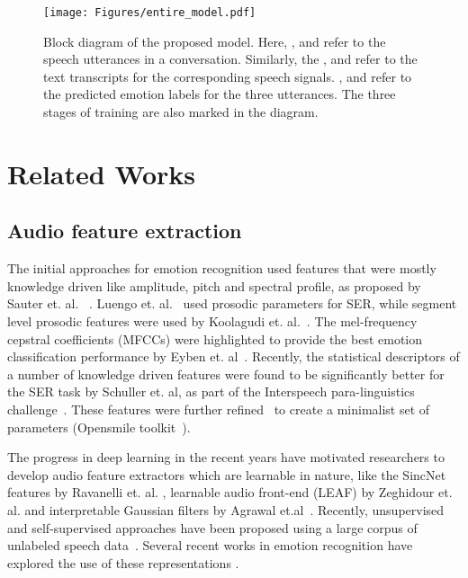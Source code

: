 \documentclass[lettersize,journal]{IEEEtran}
\begin{document}
\begin{figure*}
    \centering
    \texttt{[image: Figures/entire\_model.pdf]}
    \vspace{-0.1in}
    \caption{Block diagram of the proposed model. Here, ,  and  refer to the speech utterances in a conversation. Similarly, the ,  and  refer to the text transcripts for the corresponding speech signals. ,  and  refer to the predicted emotion labels for the three utterances. The three stages of training are also marked in the diagram.}\label{fig:entire model}
    \vspace{-0.1in}

\end{figure*}

\section{Related Works}\label{relatedworks}
\subsection{Audio feature extraction}
The initial approaches for emotion recognition used features that were mostly knowledge driven like amplitude, pitch and spectral profile, as proposed by Sauter et. al. ~\cite{sauter2010perceptual}. Luengo et. al.~\cite{luengo2005automatic} used prosodic parameters for SER, while segment level prosodic features were used by Koolagudi et. al.~\cite{koolagudi2011speech}. The mel-frequency cepstral coefficients (MFCCs) were highlighted to provide the best emotion classification performance by Eyben et. al~\cite{eyben2013affect}. Recently, the statistical descriptors of a number of knowledge driven features were found to be significantly better for the SER task by Schuller et. al, as part of the Interspeech para-linguistics challenge~\cite{schuller2013interspeech}. These features were further refined~\cite{eyben2015geneva} to create a minimalist set of parameters (Opensmile toolkit~\cite{eyben2010opensmile}). 

The progress in deep learning in the recent years have motivated researchers to develop audio feature extractors which are learnable in nature, like the SincNet features by Ravanelli et. al. \cite{ravanelli2018speaker}, learnable audio front-end (LEAF) by Zeghidour et. al. \cite{zeghidour2021leaf} and interpretable Gaussian filters by Agrawal et.al~\cite{agrawal2019modulation,agrawal2020interpretable}. Recently, unsupervised and self-supervised approaches have been proposed using a large corpus of unlabeled speech data~\cite{schneider2019wav2vec, baevski2020wav2vec}. 
Several recent works in emotion recognition have explored the use of these representations \cite{siriwardhana2020jointly, macary2021use, pepino2021emotion}.
\end{document}
